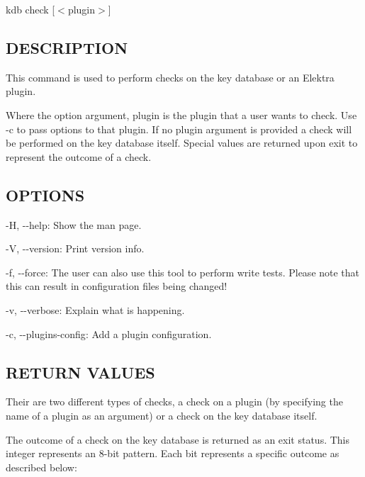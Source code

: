 {\ttfamily kdb check \mbox{[}$<$plugin$>$\mbox{]}}

\subsection*{D\+E\+S\+C\+R\+I\+P\+T\+I\+O\+N}

This command is used to perform checks on the key database or an Elektra plugin.

Where the option argument, {\ttfamily plugin} is the plugin that a user wants to check. Use {\ttfamily -\/c} to pass options to that plugin. If no {\ttfamily plugin} argument is provided a check will be performed on the key database itself. Special values are returned upon exit to represent the outcome of a check.

\subsection*{O\+P\+T\+I\+O\+N\+S}


\begin{DoxyItemize}
\item {\ttfamily -\/\+H}, {\ttfamily -\/-\/help}\+: Show the man page.
\item {\ttfamily -\/\+V}, {\ttfamily -\/-\/version}\+: Print version info.
\item {\ttfamily -\/f}, {\ttfamily -\/-\/force}\+: The user can also use this tool to perform write tests. Please note that this can result in configuration files being changed!
\item {\ttfamily -\/v}, {\ttfamily -\/-\/verbose}\+: Explain what is happening.
\item {\ttfamily -\/c}, {\ttfamily -\/-\/plugins-\/config}\+: Add a plugin configuration.
\end{DoxyItemize}

\subsection*{R\+E\+T\+U\+R\+N V\+A\+L\+U\+E\+S}

Their are two different types of checks, a check on a plugin (by specifying the name of a plugin as an argument) or a check on the key database itself.

The outcome of a check on the key database is returned as an exit status. This integer represents an 8-\/bit pattern. Each bit represents a specific outcome as described below\+:


